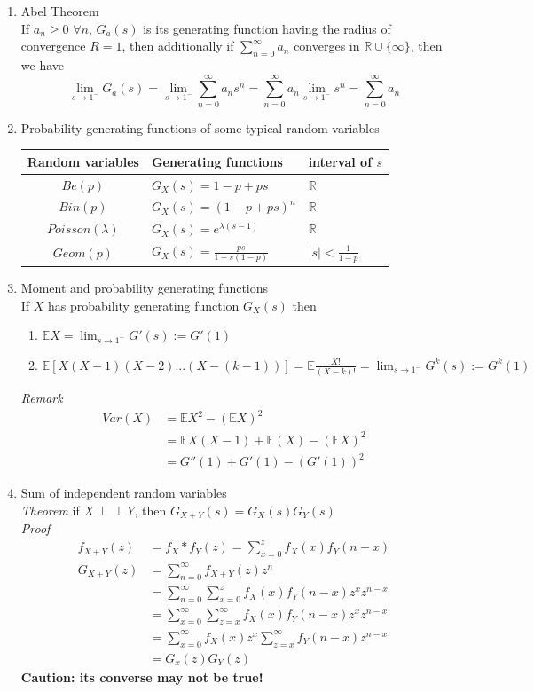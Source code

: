 \documentclass[11pt]{article}
\newcommand{\indep}{\perp \!\!\! \perp}
\begin{document}
\begin{enumerate}
\item Abel Theorem\\
If $a_n \geq 0\,\, \forall n$, $G_a(s)$ is its generating function having the radius of convergence $R =1$, then additionally if $\sum_{n=0}^{\infty}a_n$ converges in $\mathbb{R} \cup \{\infty\}$, then we have 
$$\lim_{s \to 1^{-}} G_{a}(s) = \lim_{s \to 1^{-}} \sum_{n=0}^{\infty} a_n s^n = \sum_{n=0}^{\infty}a_n \lim_{s \to 1^{-}} s^{n} = \sum_{n=0}^{\infty}a_n$$

\item Probability generating functions of some typical random variables\\
\begin{tabular}{|c|p{6cm}|p{6cm}|}
\hline
Random variables& Generating functions& interval of $s$\\
\hline
$Be(p)$& $G_{X}(s) = 1-p + ps$& $\mathbb{R}$\\
\hline
$Bin(p)$& $G_{X}(s) = (1-p + ps)^n$& $\mathbb{R}$\\
\hline
$Poisson(\lambda)$& $G_{X}(s) = e^{\lambda (s-1)}$& $\mathbb{R}$\\
\hline
$Geom(p)$& $G_{X}(s) = \frac{ps}{1-s(1-p)}$& $|s| < \frac{1}{1-p}$\\
\hline
\end{tabular}

\item Moment and probability generating functions\\
If $X$ has probability generating function $G_{X}(s)$ then
\begin{enumerate}
\item $\mathbb{E}X = \lim_{s \to 1^{-}}G'(s) := G'(1)$
\item $\mathbb{E}[X(X-1)(X-2)...(X-(k-1))]=\mathbb{E}\frac{X!}{(X-k)!}= \lim_{s \to 1^{-}}G^{k}(s):= G^{k}(1)$
\end{enumerate}
\textit{Remark}
\begin{align*}
Var(X) &= \mathbb{E}X^2 - (\mathbb{E}X)^2\\
&= \mathbb{E}X(X-1) + \mathbb{E}(X)-(\mathbb{E}X)^2\\
&= G''(1) + G'(1) -(G'(1))^2
\end{align*}

\item Sum of independent random variables\\
\textit{Theorem} if $X \indep Y$, then $G_{X+Y}(s)= G_{X}(s)G_Y(s)$\\
\textit{Proof} 
\begin{align*}
f_{X+Y}(z) &= f_{X}*f_{Y}(z) = \sum_{x=0}^{z} f_{X}(x)f_{Y}(n-x)\\
G_{X+Y}(z) &= \sum_{n=0}^{\infty}f_{X+Y}(z)z^{n} \\
&= \sum_{n=0}^{\infty}\sum_{x=0}^{z} f_{X}(x)f_{Y}(n-x)z^{x} z^{n-x}\\
&= \sum_{x=0}^{\infty}\sum_{z=x}^{\infty} f_{X}(x)f_{Y}(n-x)z^{x} z^{n-x}\\
&= \sum_{x=0}^{\infty}f_{X}(x)z^{x} \sum_{z=x}^{\infty} f_{Y}(n-x) z^{n-x}\\
&= G_{x}(z) G_{Y}(z)
\end{align*}
\textbf{Caution: its converse may not be true!}


\end{enumerate}
\end{document}
